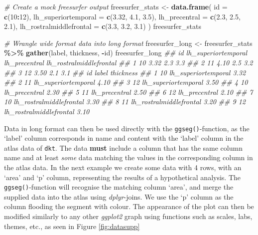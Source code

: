 \documentclass[fleqn,10pt]{wlpeerj} %
\newenvironment{Shaded}{\begin{snugshade}}{\end{snugshade}}
\newcommand{\CommentTok}[1]{\textcolor[rgb]{0.56,0.35,0.01}{\textit{#1}}}
\newcommand{\DataTypeTok}[1]{\textcolor[rgb]{0.13,0.29,0.53}{#1}}
\newcommand{\DecValTok}[1]{\textcolor[rgb]{0.00,0.00,0.81}{#1}}
\newcommand{\FloatTok}[1]{\textcolor[rgb]{0.00,0.00,0.81}{#1}}
\newcommand{\KeywordTok}[1]{\textcolor[rgb]{0.13,0.29,0.53}{\textbf{#1}}}
\newcommand{\NormalTok}[1]{#1}
\newcommand{\OperatorTok}[1]{\textcolor[rgb]{0.81,0.36,0.00}{\textbf{#1}}}
\newcommand{\StringTok}[1]{\textcolor[rgb]{0.31,0.60,0.02}{#1}}
\begin{document}
\small

\begin{Shaded}
\begin{Highlighting}[]
\CommentTok{\# Create a mock freesurfer output}
\NormalTok{freesurfer\_stats <{-}}\StringTok{ }\KeywordTok{data.frame}\NormalTok{(}
  \DataTypeTok{id =} \KeywordTok{c}\NormalTok{(}\DecValTok{10}\OperatorTok{:}\DecValTok{12}\NormalTok{),}
  \DataTypeTok{lh\_superiortemporal =} \KeywordTok{c}\NormalTok{(}\FloatTok{3.32}\NormalTok{, }\FloatTok{4.1}\NormalTok{, }\FloatTok{3.5}\NormalTok{),}
  \DataTypeTok{lh\_precentral =} \KeywordTok{c}\NormalTok{(}\FloatTok{2.3}\NormalTok{, }\FloatTok{2.5}\NormalTok{, }\FloatTok{2.1}\NormalTok{),}
  \DataTypeTok{lh\_rostralmiddlefrontal =} \KeywordTok{c}\NormalTok{(}\FloatTok{3.3}\NormalTok{, }\FloatTok{3.2}\NormalTok{, }\FloatTok{3.1}\NormalTok{)}
\NormalTok{)}
\NormalTok{freesurfer\_stats}

\CommentTok{\# Wrangle wide format data into long format}
\NormalTok{freesurfer\_long <{-}}\StringTok{ }\NormalTok{freesurfer\_stats }\OperatorTok{\%>\%}
\StringTok{  }\KeywordTok{gather}\NormalTok{(label, thickness, }\OperatorTok{{-}}\NormalTok{id)}
\NormalTok{freesurfer\_long}
\CommentTok{\#\#   id lh\_superiortemporal lh\_precentral lh\_rostralmiddlefrontal}
\CommentTok{\#\# 1 10                3.32           2.3                     3.3}
\CommentTok{\#\# 2 11                4.10           2.5                     3.2}
\CommentTok{\#\# 3 12                3.50           2.1                     3.1}
\CommentTok{\#\#   id                   label thickness}
\CommentTok{\#\# 1 10     lh\_superiortemporal      3.32}
\CommentTok{\#\# 2 11     lh\_superiortemporal      4.10}
\CommentTok{\#\# 3 12     lh\_superiortemporal      3.50}
\CommentTok{\#\# 4 10           lh\_precentral      2.30}
\CommentTok{\#\# 5 11           lh\_precentral      2.50}
\CommentTok{\#\# 6 12           lh\_precentral      2.10}
\CommentTok{\#\# 7 10 lh\_rostralmiddlefrontal      3.30}
\CommentTok{\#\# 8 11 lh\_rostralmiddlefrontal      3.20}
\CommentTok{\#\# 9 12 lh\_rostralmiddlefrontal      3.10}
\end{Highlighting}
\end{Shaded}

\normalsize

Data in long format can then be used directly with the \texttt{ggseg()}-function, as the `label' column corresponds in name and content with the `label' column in the atlas data of \texttt{dkt}.
The data \textbf{must} include a column that has the same column name and at least \emph{some} data matching the values in the corresponding column in the atlas data.
In the next example we create some data with 4 rows, with an `area' and `p' column, representing the results of a hypothetical analysis.
The \texttt{ggseg()}-function will recognise the matching column `area', and merge the supplied data into the atlas using \emph{dplyr}-joins.
We use the `p' column as the column flooding the segment with colour.
The appearance of the plot can then be modified similarly to any other \emph{ggplot2} graph using functions such as scales, labs, themes, etc., as seen in Figure \ref{fig:datasupp}
\end{document}
